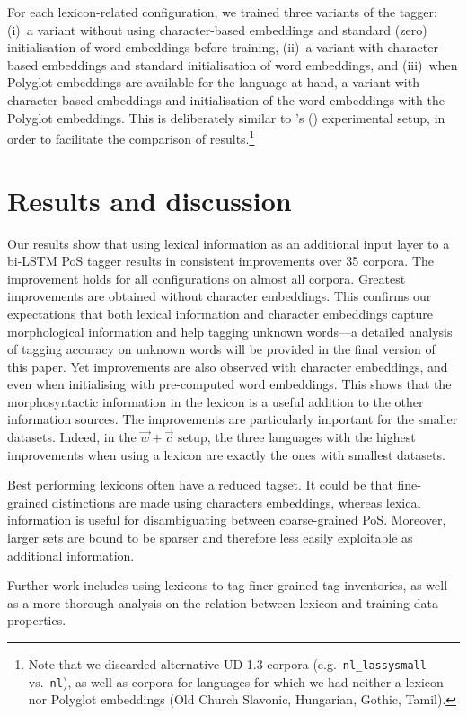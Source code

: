\documentclass[11pt,letterpaper]{article}
\begin{document}
For each lexicon-related configuration, we trained three variants of the tagger: (i)~a variant without using
character-based embeddings and standard (zero) initialisation of word embeddings before training, (ii)~a variant with
character-based embeddings and standard initialisation of word embeddings, and (iii)~when Polyglot embeddings are
available for the language at hand, a variant with character-based embeddings and initialisation of the word embeddings
with the Polyglot embeddings. This is deliberately similar to \citeauthor{plank16}'s (\citeyear{plank16}) experimental
setup, in order to facilitate the comparison of results.\footnote{Note that we discarded alternative UD 1.3 corpora
  (e.g.~{\tt nl\_lassysmall} vs.~{\tt nl}), as well as corpora for languages for which we had neither a
  lexicon nor Polyglot embeddings (Old Church Slavonic, Hungarian, Gothic, Tamil).}


\section{Results and discussion}

Our results show that using lexical information as an additional input layer to a bi-LSTM PoS tagger results in
consistent improvements over 35 corpora. The improvement holds for all configurations on almost all corpora. Greatest
improvements are obtained without character embeddings. This confirms our expectations that both lexical information and
character embeddings capture morphological information and help tagging unknown words---a detailed analysis of tagging
accuracy on unknown words will be provided in the final version of this paper. Yet improvements are also observed with
character embeddings, and even when initialising with pre-computed word embeddings. This shows that the morphosyntactic
information in the lexicon is a useful addition to the other information sources. The improvements are particularly
important for the smaller datasets. Indeed, in the $\vec{w}+\vec{c}$ setup, the three languages with the highest
improvements when using a lexicon are exactly the ones with smallest datasets.

Best performing lexicons often have a reduced tagset. It could be that fine-grained distinctions are
made using characters embeddings, whereas lexical information is useful for disambiguating between coarse-grained
PoS. Moreover, larger sets are bound to be sparser and therefore less easily exploitable as additional information.



Further work includes using lexicons to tag finer-grained tag inventories, as well as a more thorough analysis on the
relation between lexicon and training data properties.






\end{document}
